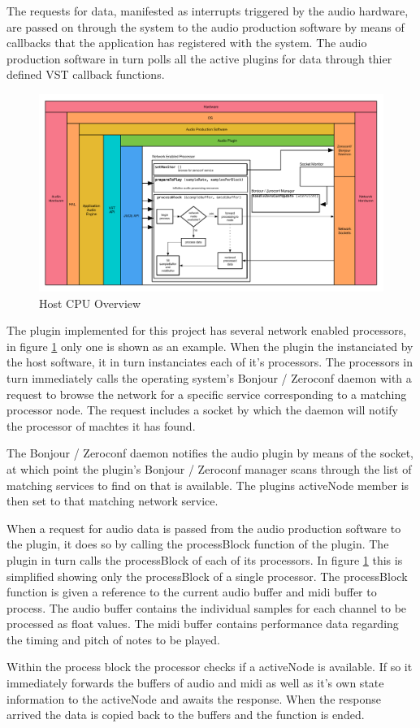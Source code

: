The requests for data, manifested as interrupts triggered by the audio hardware, are passed on through the system to the audio production software by means of callbacks that the application has registered with the system. The audio production software in turn polls all the active plugins for data through thier defined VST callback functions.

\begin{figure}[H]
    \centering
    \includegraphics[width=\textwidth]{assets/architecture_02.pdf}
    \caption{Host CPU Overview}
    \label{fig:arch_02}
\end{figure}

The plugin implemented for this project has several network enabled processors, in figure \ref{fig:arch_02} only one is shown as an example. When the plugin the instanciated by the host software, it in turn instanciates each of it's processors. The processors in turn immediately calls the operating system's Bonjour / Zeroconf daemon with a request to browse the network for a specific service corresponding to a matching processor node. The request includes a socket by which the daemon will notify the processor of machtes it has found.

The Bonjour / Zeroconf daemon notifies the audio plugin by means of the socket, at which point the plugin's Bonjour / Zeroconf manager scans through the list of matching services to find on that is available. The plugins activeNode member is then set to that matching network service.

When a request for audio data is passed from the audio production software to the plugin, it does so by calling the processBlock function of the plugin. The plugin in turn calls the processBlock of each of its processors. In figure \ref{fig:arch_02} this is simplified showing only the processBlock of a single processor. The processBlock function is given a reference to the current audio buffer and midi buffer to process. The audio buffer contains the individual samples for each channel to be processed as float values. The midi buffer contains performance data regarding the timing and pitch of notes to be played.

Within the process block the processor checks if a activeNode is available. If so it immediately forwards the buffers of audio and midi as well as it's own state information to the activeNode and awaits the response. When the response arrived the data is copied back to the buffers and the function is ended.